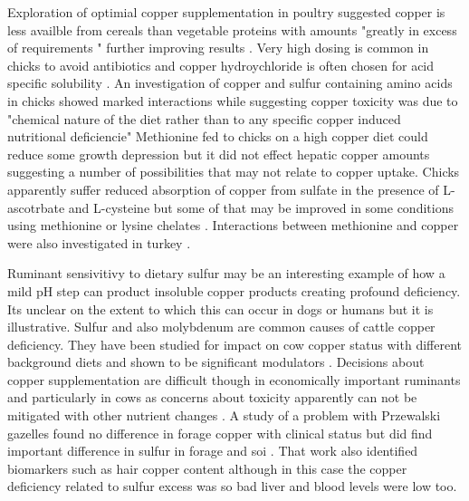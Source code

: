 {Exploration of optimial copper supplementation in poultry
suggested copper is less availble from cereals than vegetable
proteins with amounts "greatly in excess of requirements "
further improving results
\cite{Leeson_Copper_metabolism_dietary_2009}.
Very high dosing is common in chicks to avoid antibiotics
and copper hydroychloride is often chosen for
acid specific solubility 
\cite{Nguyen_Kheravii_Wu_Sources_levels_2022}.
An investigation of copper and sulfur containing amino acids
in chicks showed marked interactions while suggesting copper toxicity
was due to "chemical nature of the diet rather than to any specific
copper induced nutritional deficiencie"
\cite{ROBBINS_BAKER_Effect_High_Level_1980}
Methionine fed to chicks on a high copper diet could reduce
some growth depression but it did not effect hepatic copper
amounts
\cite{LEDOUX_MILES_AMMERMAN_Interaction_Dietary_Nutrient_1987}
suggesting a number of possibilities that may not relate to copper uptake.
Chicks apparently suffer reduced absorption of copper from sulfate
in the presence of L-ascotrbate and L-cysteine but some of that
may be improved in some conditions using methionine or lysine
chelates
\cite{Aoyagi_Baker_Copper_Amino_Acid_Complexes_1994}.
Interactions between methionine and copper were also investigated in turkey
\cite{KASHANI_SAMIE_EMERICK_Effect_Copper_with_1986}.


Ruminant sensivitivy to dietary sulfur may be an interesting
example of how a mild pH step can product insoluble
copper products creating profound deficiency.
Its unclear on the extent to which this can occur in dogs or
humans but it is illustrative.
Sulfur and also molybdenum are common causes
of cattle copper deficiency. They  have been studied
for impact on cow copper status with different background diets
and shown to be significant modulators
\cite{Sinclair_Johnson_Wilson_Added_dietary_sulfur_2017}.
Decisions about copper supplementation are  difficult 
though in 
economically important ruminants \cite{PMC7602799} and particularly
in cows as concerns about toxicity 
\cite{LopezAlonso_Miranda_Copper_Supplementation_Challenge_2020}
apparently can not be mitigated with other nutrient changes
.
A study of a problem with Przewalski gazelles found no difference
in forage copper with clinical status but did find 
important difference in sulfur in forage and soi
\cite{PMC2777290}.
That work also identified  biomarkers such as
hair copper content although in this case the copper deficiency
related to sulfur excess was so bad liver and blood levels were low
too.


}
